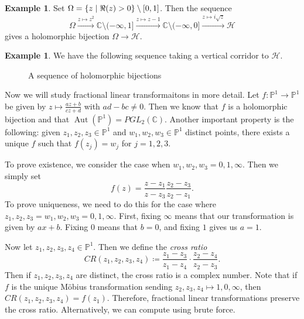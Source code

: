 \documentclass[leqno, openany]{memoir}
\theoremstyle{definition}
\newtheorem{exm}[thm]{Example}
\theoremstyle{remark}
\theoremstyle{plain}
\theoremstyle{definition}
\theoremstyle{remark}
\newcommand{\C}{\mathbb{C}}
\renewcommand{\P}{\mathbb{P}}
\newcommand{\mc}[1]{\mathcal{#1}}
\DeclareMathOperator{\Aut}{Aut}
\begin{document}
\begin{exm}
    Set $\Omega = \qty{z \mid \real (z) > 0} \setminus [0,1]$. Then the sequence
    \[ \Omega \xrightarrow{z \mapsto z^2} \C \setminus (-\infty, 1] \xrightarrow{z \mapsto z-1} \C \setminus (-\infty, 0] \xrightarrow{z \mapsto i\sqrt{z}} \mc{H} \]
    gives a holomorphic bijection $\Omega \to \mc{H}$.
\end{exm}

\begin{exm}
    We have the following sequence taking a vertical corridor to $\mc{H}$.
    \begin{figure}[H]
    \begin{center}
    \end{center}
    \caption{A sequence of holomorphic bijections}%
    \label{fig:}
    \end{figure}
\end{exm}

Now we will study fractional linear transformaitons in more detail. Let $f \colon \P^1 \to \P^1$ be given by $z \mapsto \frac{az+b}{cz+d}$ with $ad-bc \neq 0$. Then we know that $f$ is a holomorphic bijection and that $\Aut(\P^1) = PGL_2(\C)$. Another important property is the following: given $z_1, z_2, z_3 \in \P^1$ and $w_1, w_2, w_3 \in \P^1$ distinct points, there exists a unique $f$ such that $f(z_j) = w_j$ for $j = 1,2,3$.

To prove existence, we consider the case when $w_1, w_2, w_3 = 0,1,\infty$. Then we simply set 
\[ f(z) = \frac{z - z_1}{z-z_3} \frac{z_2 - z_3}{z_2 - z_1}. \]
To prove uniqueness, we need to do this for the case where $z_1,z_2,z_3 = w_1,w_2,w_3 = 0,1,\infty$. First, fixing $\infty$ means that our transformation is given by $ax + b$. Fixing $0$ means that $b = 0$, and fixing $1$ gives us $a = 1$.

Now let $z_1, z_2, z_3, z_4 \in \P^1$. Then we define the \textit{cross ratio}
\[ CR(z_1, z_2, z_3, z_4) \coloneqq \frac{z_1 - z_3}{z_1 - z_4} \cdot \frac{z_2 - z_4}{z_2 - z_3}. \]
Then if $z_1, z_2, z_3, z_4$ are distinct, the cross ratio is a complex number. Note that if $f$ is the unique M\"obius transformation sending $z_2, z_3, z_4 \mapsto 1,0, \infty$, then $CR(z_1, z_2, z_3, z_4) = f(z_1)$. Therefore, fractional linear transformations preserve the cross ratio. Alternatively, we can compute using brute force.
\end{document}

